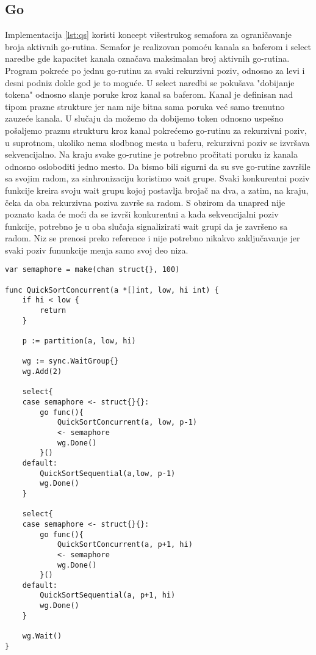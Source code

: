 \documentclass[12pt,oneside]{memoir}
\begin{document}
\subsection{Go}
\label{qs:go}
Implementacija \ref{lst:qs} koristi koncept višestrukog semafora za ograničavanje broja aktivnih go-rutina. Semafor je realizovan pomoću kanala sa baferom i select naredbe gde kapacitet kanala označava maksimalan broj aktivnih go-rutina. Program pokreće po jednu go-rutinu za svaki rekurzivni poziv, odnosno za levi i desni podniz dokle god je to moguće. U select naredbi se pokušava "dobijanje tokena" odnosno slanje poruke kroz kanal sa baferom. Kanal je definisan nad tipom prazne strukture jer nam nije bitna sama poruka već samo trenutno zauzeće kanala. U slučaju da možemo da dobijemo token odnosno uspešno pošaljemo praznu strukturu kroz kanal pokrećemo go-rutinu za rekurzivni poziv, u suprotnom, ukoliko nema slodbnog mesta u baferu, rekurzivni poziv se izvršava sekvencijalno. Na kraju svake go-rutine je potrebno pročitati poruku iz kanala odnosno osloboditi jedno mesto. Da bismo bili sigurni da su sve go-rutine završile sa svojim radom, za sinhronizaciju koristimo wait grupe. Svaki konkurentni poziv funkcije kreira svoju wait grupu kojoj postavlja brojač na dva, a zatim, na kraju, čeka da oba rekurzivna poziva završe sa radom. S obzirom da unapred nije poznato kada će moći da se izvrši konkurentni a kada sekvencijalni poziv funkcije, potrebno je u oba slučaja signalizirati wait grupi da je završeno sa radom. Niz se prenosi preko reference i nije potrebno nikakvo zaključavanje jer svaki poziv fununkcije menja samo svoj deo niza.

\begin{center}
\begin{lstlisting}[caption=Go implementacija konkurentne quicksort funkcije,label={lst:qs},float,  backgroundcolor=\color{background}]
var semaphore = make(chan struct{}, 100)

func QuickSortConcurrent(a *[]int, low, hi int) {
	if hi < low {
		return
	}

	p := partition(a, low, hi)

	wg := sync.WaitGroup{}
	wg.Add(2)

	select{
	case semaphore <- struct{}{}:
		go func(){
			QuickSortConcurrent(a, low, p-1)
			<- semaphore
			wg.Done()
		}()
	default:
		QuickSortSequential(a,low, p-1)
		wg.Done()
	}

	select{
	case semaphore <- struct{}{}:
		go func(){
			QuickSortConcurrent(a, p+1, hi)
			<- semaphore
			wg.Done()
		}()
	default:
		QuickSortSequential(a, p+1, hi)
		wg.Done()
	}

	wg.Wait()
}
\end{lstlisting}
\end{center}
\end{document}
